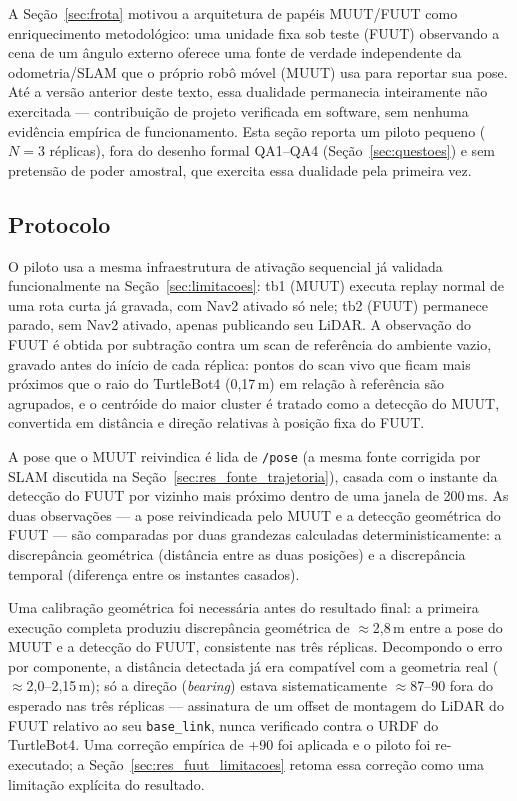 A Seção~\ref{sec:frota} motivou a arquitetura de papéis MUUT/FUUT como
enriquecimento metodológico: uma unidade fixa sob teste (FUUT) observando
a cena de um ângulo externo oferece uma fonte de verdade independente da
odometria/SLAM que o próprio robô móvel (MUUT) usa para reportar sua
pose. Até a versão anterior deste texto, essa dualidade permanecia
inteiramente não exercitada --- contribuição de projeto verificada em
software, sem nenhuma evidência empírica de funcionamento. Esta seção
reporta um piloto pequeno ($N=3$ réplicas), fora do desenho formal
QA1--QA4 (Seção~\ref{sec:questoes}) e sem pretensão de poder amostral,
que exercita essa dualidade pela primeira vez.

\subsection{Protocolo}

O piloto usa a mesma infraestrutura de ativação sequencial já validada
funcionalmente na Seção~\ref{sec:limitacoes}: tb1 (MUUT) executa replay
normal de uma rota curta já gravada, com Nav2 ativado só nele; tb2 (FUUT)
permanece parado, sem Nav2 ativado, apenas publicando seu LiDAR. A
observação do FUUT é obtida por subtração contra um scan de referência do
ambiente vazio, gravado antes do início de cada réplica: pontos do scan
vivo que ficam mais próximos que o raio do TurtleBot4 (0,17\,m) em
relação à referência são agrupados, e o centróide do maior cluster é
tratado como a detecção do MUUT, convertida em distância e direção
relativas à posição fixa do FUUT.

A pose que o MUUT reivindica é lida de \texttt{/\allowbreak pose} (a
mesma fonte corrigida por SLAM discutida na Seção~\ref{sec:res_fonte_trajetoria}),
casada com o instante da detecção do FUUT por vizinho mais próximo dentro
de uma janela de 200\,ms. As duas observações --- a pose reivindicada
pelo MUUT e a detecção geométrica do FUUT --- são comparadas por duas
grandezas calculadas deterministicamente: a discrepância geométrica
(distância entre as duas posições) e a discrepância temporal (diferença
entre os instantes casados).

Uma calibração geométrica foi necessária antes do resultado final: a
primeira execução completa produziu discrepância geométrica de
$\approx$2,8\,m entre a pose do MUUT e a detecção do FUUT, consistente
nas três réplicas. Decompondo o erro por componente, a distância
detectada já era compatível com a geometria real ($\approx$2,0--2,15\,m);
só a direção (\textit{bearing}) estava sistematicamente $\approx$87--90\textdegree{}
fora do esperado nas três réplicas --- assinatura de um offset de
montagem do LiDAR do FUUT relativo ao seu \texttt{base\_\allowbreak link},
nunca verificado contra o URDF do TurtleBot4. Uma correção empírica de
+90\textdegree{} foi aplicada e o piloto foi re-executado; a Seção~\ref{sec:res_fuut_limitacoes}
retoma essa correção como uma limitação explícita do resultado.

